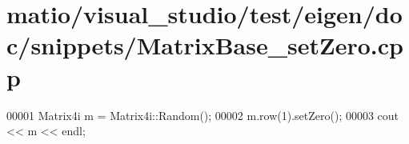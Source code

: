 \hypertarget{matio_2visual__studio_2test_2eigen_2doc_2snippets_2_matrix_base__set_zero_8cpp_source}{}\section{matio/visual\+\_\+studio/test/eigen/doc/snippets/\+Matrix\+Base\+\_\+set\+Zero.cpp}
\label{matio_2visual__studio_2test_2eigen_2doc_2snippets_2_matrix_base__set_zero_8cpp_source}

\begin{DoxyCode}
00001 Matrix4i m = Matrix4i::Random();
00002 m.row(1).setZero();
00003 cout << m << endl;
\end{DoxyCode}

